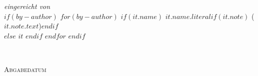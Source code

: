 \begin{titlepage}
\begin{flushleft}
        \vspace{1.0cm}
        
        {\rmfamily\normalsize
            \textit{eingereicht von}\\
            $if(by-author)$
            $for(by-author)$
                $if(it.name)$
                    $it.name.literal$$if(it.note)$ ({$it.note.text$})$endif$\\ 
                $else$
                    $it$
                $endif$
            $endfor$
            $endif$
        }

        
        
        \vfill
        

        {\rmfamily\footnotesize
            \textsc{\texplatesupervisortype}\\
            \texplatesupervisor

            \vspace{0.5cm}

            \textsc{Abgabedatum}\\
            {\texplatedeadline} %
            

        }

    \end{flushleft}
\end{titlepage}
